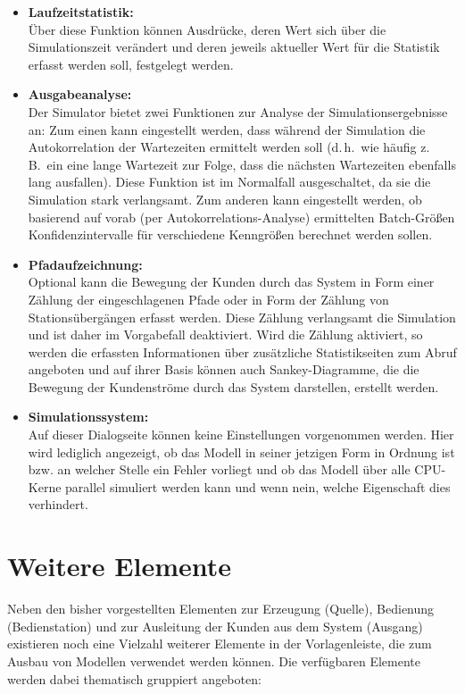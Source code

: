 \documentclass[deutsch]{svmono}
\begin{document}
\begin{itemize}
\item
\textbf{Laufzeitstatistik:}\\
Über diese Funktion können Ausdrücke, deren Wert sich über die Simulationszeit verändert und deren jeweils aktueller Wert für die Statistik erfasst werden soll, festgelegt werden.
\item
\textbf{Ausgabeanalyse:}\\
Der Simulator bietet zwei Funktionen zur Analyse der Simulationsergebnisse an: Zum einen kann eingestellt werden, dass während der Simulation die Autokorrelation der Wartezeiten ermittelt werden soll (d.\,h.\ wie häufig z.\,B.\ ein eine lange Wartezeit zur Folge, dass die nächsten Wartezeiten ebenfalls lang ausfallen). Diese Funktion ist im Normalfall ausgeschaltet, da sie die Simulation stark verlangsamt. Zum anderen kann eingestellt werden, ob basierend auf vorab (per Autokorrelations-Analyse) ermittelten Batch-Größen Konfidenzintervalle für verschiedene Kenngrößen berechnet werden sollen.
\item
\textbf{Pfadaufzeichnung:}\\
Optional kann die Bewegung der Kunden durch das System in Form einer Zählung der eingeschlagenen Pfade oder in Form der Zählung von Stationsübergängen erfasst werden.
Diese Zählung verlangsamt die Simulation und ist daher im Vorgabefall deaktiviert. Wird die Zählung aktiviert, so werden die erfassten Informationen über zusätzliche
Statistikseiten zum Abruf angeboten und auf ihrer Basis können auch Sankey-Diagramme, die die Bewegung der Kundenströme durch das System darstellen, erstellt werden.
\item
\textbf{Simulationssystem:}\\
Auf dieser Dialogseite können keine Einstellungen vorgenommen werden. Hier wird lediglich angezeigt, ob das Modell in seiner jetzigen Form in Ordnung ist bzw. an welcher Stelle ein Fehler vorliegt und ob das Modell über alle CPU-Kerne parallel simuliert werden kann und wenn nein, welche Eigenschaft dies verhindert.
\end{itemize}

\chapter{Weitere Elemente}

Neben den bisher vorgestellten Elementen zur Erzeugung (Quelle), Bedienung (Bedienstation) und zur Ausleitung der Kunden aus dem System (Ausgang) existieren noch eine Vielzahl weiterer Elemente in der Vorlagenleiste, die zum Ausbau von Modellen verwendet werden können. Die verfügbaren Elemente werden dabei thematisch gruppiert angeboten:
\end{document}
